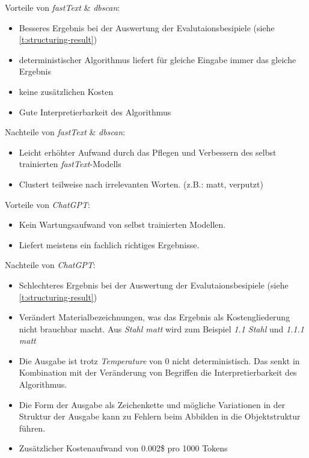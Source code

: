 

\noindent Vorteile von \textit{fastText} \& \textit{\ac{dbscan}}:
\begin{itemize}
	\setlength\itemsep{0em}
	\item Besseres Ergebnis bei der Auswertung der Evalutaionsbesipiele (siehe \autoref{t:structuring-result})
	\item deterministischer Algorithmus liefert für gleiche Eingabe immer das gleiche Ergebnis
	\item keine zusätzlichen Kosten
	\item Gute Interpretierbarkeit des Algorithmus
\end{itemize}
Nachteile von \textit{fastText} \& \textit{\ac{dbscan}}:
\begin{itemize}
	\setlength\itemsep{0em}
	\item Leicht erhöhter Aufwand durch das Pflegen und Verbessern des selbst trainierten \textit{fastText}-Modells
	\item Clustert teilweise nach irrelevanten Worten. (z.B.: matt, verputzt)
\end{itemize}
Vorteile von \textit{ChatGPT}:
\begin{itemize}
	\setlength\itemsep{0em}
	\item Kein Wartungsaufwand von selbst trainierten Modellen.
	\item Liefert meistens ein fachlich richtiges Ergebnisse.
\end{itemize}
Nachteile von \textit{ChatGPT}:
\begin{itemize}
	\setlength\itemsep{0em}
	\item Schlechteres Ergebnis bei der Auswertung der Evalutaionsbesipiele (siehe \autoref{t:structuring-result})
	\item Verändert Materialbezeichnungen, was das Ergebnis als Kostengliederung nicht brauchbar macht. Aus \textit{Stahl matt} wird zum Beispiel \textit{1.1 Stahl} und \textit{1.1.1 matt}
	\item Die Ausgabe ist trotz \textit{Temperature} von 0 nicht deterministisch. Das senkt in Kombination mit der Veränderung von Begriffen die Interpretierbarkeit des Algorithmus.
	\item Die Form der Ausgabe als Zeichenkette und mögliche Variationen in der Struktur der Ausgabe kann zu Fehlern beim Abbilden in die Objektstruktur führen.
	\item Zusätzlicher Kostenaufwand von 0.002\$ pro 1000 Tokens
\end{itemize}
